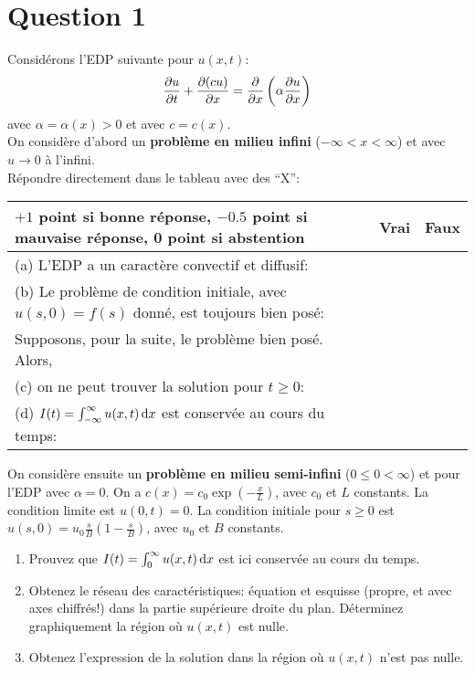 


\section*{Question 1}
Considérons l'EDP suivante pour $u(x,t)$:
\[ \frac{\partial u}{\partial t} + \frac{\partial (cu)}{\partial x} =
\frac{\partial }{\partial x}\left(\alpha\frac{\partial u}{\partial x}\right) \]
avec $\alpha = \alpha(x) > 0$ et avec $c = c(x)$.\\
On considère d'abord un \textbf{problème en milieu infini}
($-\infty < x < \infty$) et avec $u\to 0$ à l'infini.\\
Répondre directement dans le tableau avec des ``X'':

\begin{center}
  \begin{tabular}{p{}|l|l|}
    $+1$ point si bonne réponse, $-0.5$ point si mauvaise réponse,
    0 point si abstention & Vrai & Faux\\
    \hline
    (a) L'EDP a un caractère convectif et diffusif:&&\\
    (b) Le problème de condition initiale, avec $u(s, 0) = f(s)$ donné,
    est toujours bien posé:&&\\
    Supposons, pour la suite, le problème bien posé. Alors,&&\\
    (c) on ne peut trouver la solution pour $t \geq 0$:&&\\
    (d) $I(t)=\int_{-\infty}^{\infty} u(x,t)\operatorname{d}\! x$ est
    conservée au cours du temps:&&\\
  \end{tabular}
\end{center}

On considère ensuite un \textbf{problème en milieu semi-infini}
($0 \leq 0 < \infty$) et pour l'EDP avec $\alpha = 0$.
On a $c(x) = c_0\exp\left(-\frac{x}{L}\right)$,
avec $c_0$ et $L$ constants.
La condition limite est $u(0,t) = 0$.
La condition initiale pour $s \geq 0$ est
$u(s,0) = u_0\frac{s}{B}\left(1-\frac{s}{B}\right)$,
avec $u_0$ et $B$ constants.
\begin{enumerate}
  \item Prouvez que $I(t)=\int_0^\infty u(x, t) \operatorname{d}\! x$
    est ici conservée au cours du temps.
  \item Obtenez le réseau des caractéristiques:
    équation et esquisse (propre, et avec axes chiffrés!)
    dans la partie supérieure droite du plan.
    Déterminez graphiquement la région où $u(x,t)$ est nulle.
  \item Obtenez l'expression de la solution dans la région où
    $u(x,t)$ n'est pas nulle.
\end{enumerate}


